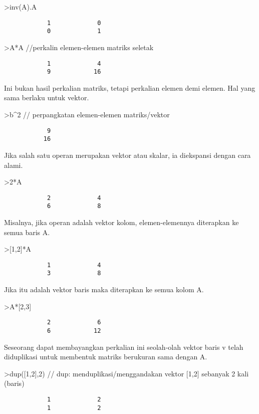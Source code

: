 \documentclass[
]{book}
\begin{document}
\textgreater inv(A).A

\begin{verbatim}
            1             0 
            0             1 
\end{verbatim}

\textgreater A*A //perkalin elemen-elemen matriks seletak

\begin{verbatim}
            1             4 
            9            16 
\end{verbatim}

Ini bukan hasil perkalian matriks, tetapi perkalian elemen demi elemen. Hal yang sama berlaku untuk vektor.

\textgreater b\^{}2 // perpangkatan elemen-elemen matriks/vektor

\begin{verbatim}
            9 
           16 
\end{verbatim}

Jika salah satu operan merupakan vektor atau skalar, ia diekspansi dengan cara alami.

\textgreater2*A

\begin{verbatim}
            2             4 
            6             8 
\end{verbatim}

Misalnya, jika operan adalah vektor kolom, elemen-elemennya diterapkan ke semua baris A.

\textgreater{[}1,2{]}*A

\begin{verbatim}
            1             4 
            3             8 
\end{verbatim}

Jika itu adalah vektor baris maka diterapkan ke semua kolom A.

\textgreater A*{[}2,3{]}

\begin{verbatim}
            2             6 
            6            12 
\end{verbatim}

Seseorang dapat membayangkan perkalian ini seolah-olah vektor baris v telah diduplikasi untuk membentuk matriks berukuran sama dengan A.

\textgreater dup({[}1,2{]},2) // dup: menduplikasi/menggandakan vektor {[}1,2{]} sebanyak 2 kali (baris)

\begin{verbatim}
            1             2 
            1             2 
\end{verbatim}
\end{document}
